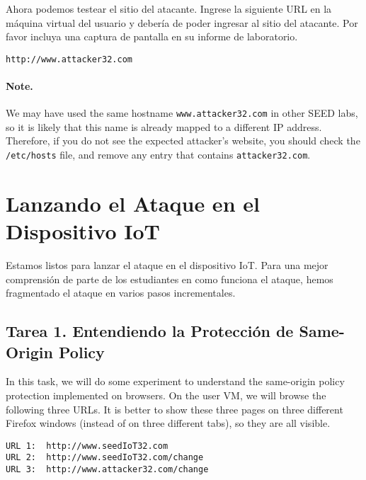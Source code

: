 Ahora podemos testear el sitio del atacante.
Ingrese la siguiente URL en la máquina virtual del usuario y debería de poder ingresar al sitio del atacante.
Por favor incluya una captura de pantalla en su informe de laboratorio.


\begin{lstlisting}
http://www.attacker32.com
\end{lstlisting}

\paragraph{Note.} We may have used the same hostname  
\texttt{www.attacker32.com} in other SEED labs, so it is likely 
that this name is already mapped to a different IP address. Therefore,
if you do not see the expected attacker's website, you should 
check the \texttt{/etc/hosts} file, and remove
any entry that contains \texttt{attacker32.com}. 




\section{Lanzando el Ataque en el Dispositivo IoT}

Estamos listos para lanzar el ataque en el dispositivo IoT. Para una mejor comprensión de parte de los estudiantes en como funciona el ataque, hemos fragmentado el ataque en varios pasos incrementales.


\subsection{Tarea 1. Entendiendo la Protección de Same-Origin Policy}

In this task, we will do some experiment to understand the 
same-origin policy protection implemented on browsers. On the user VM,
we will browse the following three URLs. It is better to show these three pages on three
different Firefox windows (instead of on three different tabs), so they are all visible. 


\begin{lstlisting}
URL 1:  http://www.seedIoT32.com
URL 2:  http://www.seedIoT32.com/change
URL 3:  http://www.attacker32.com/change
\end{lstlisting}

